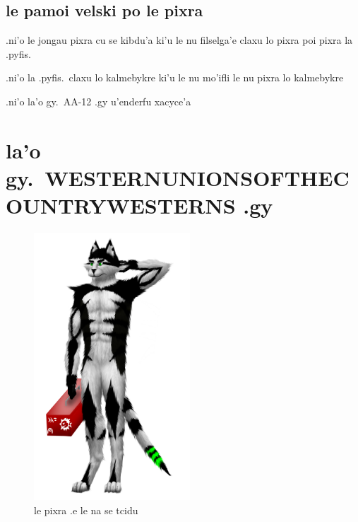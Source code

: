 \documentclass{report}
\newcommand\imageheight{10cm}
\begin{document}
\section{le pamoi velski po le pixra}
.ni'o le jongau pixra cu se kibdu'a ki'u le nu filselga'e claxu lo pixra poi pixra la .pyfis.

.ni'o la .pyfis.\ claxu lo kalmebykre ki'u le nu mo'ifli le nu pixra lo kalmebykre

.ni'o la'o gy.\ AA-12 .gy u'enderfu xacyce'a

\chapter{la'o gy.\ WESTERNUNIONSOFTHECOUNTRYWESTERNS .gy}
\begin{figure}[ht]
	\centering
	\includegraphics[height=\imageheight]{50x/toolbox/westernunionsofthecountrywesterns.png}
	\caption[center]{le pixra .e le na se tcidu}
\end{figure}
\end{document}
